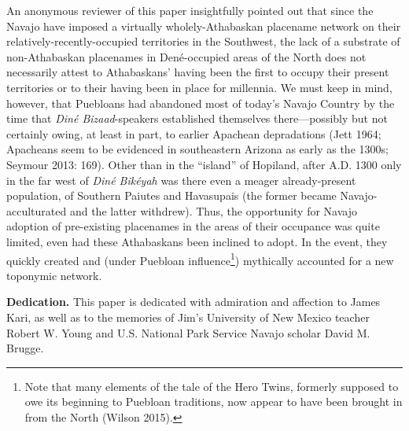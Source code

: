   An anonymous reviewer of this paper insightfully pointed out that since the Navajo have imposed a virtually wholely-Athabaskan placename network on their relatively-recently-occupied territories in the Southwest, the lack of a substrate of non-Athabaskan placenames in Dené-occupied areas of the North does not necessarily attest to Athabaskans’ having been the first to occupy their present territories or to their having been in place for millennia.  We must keep in mind, however, that Puebloans had abandoned most of today’s Navajo Country by the time that \textit{Diné Bizaad}{}-speakers established themselves there—possibly but not certainly owing, at least in part, to earlier Apachean depradations (Jett 1964; Apacheans seem to be evidenced in southeastern Arizona as early as the 1300s; Seymour 2013: 169).  Other than in the “island” of Hopiland, after A.D. 1300 only in the far west of \textit{Diné Bikéyah} was there even a meager already-present population, of Southern Paiutes and Havasupais (the former became Navajo-acculturated and the latter withdrew).  Thus, the opportunity for Navajo adoption of pre-existing placenames in the areas of their occupance was quite limited, even had these Athabaskans been inclined to adopt.  In the event, they quickly created and (under Puebloan influence\footnote{Note that many elements of the tale of the Hero Twins, formerly supposed to owe its beginning to Puebloan traditions, now appear to have been brought in from the North (Wilson 2015).}) mythically accounted for a new toponymic network.


\vspace{2cm}


\noindent
\textbf{Dedication.}  This paper is dedicated with admiration and affection to James Kari, as well as to the memories of Jim’s University of New Mexico teacher Robert W. Young and U.S. National Park Service Navajo scholar David M. Brugge.


